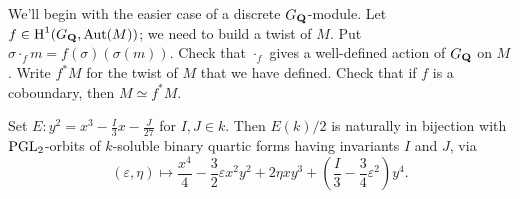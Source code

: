 We'll begin with the easier case of a discrete $G_{\mathbf{Q}}$-module. Let 
$f\in \operatorname{H}^1(G_{\mathbf{Q}},\operatorname{Aut}(M))$; we need to build a twist of $M$. 
Put $\sigma\cdot_f m = f(\sigma)(\sigma(m))$. Check that $\cdot_f$ gives 
a well-defined action of $G_{\mathbf{Q}}$ on $M$. Write $f^\ast M$ for the twist of $M$ 
that we have defined. Check that if $f$ is a coboundary, then 
$M\simeq f^\ast M$. 

\begin{theorem}
Set $E:y^2=x^3-\frac{I}{3} x-\frac{J}{27}$ for $I,J\in k$. Then 
$E(k)/2$ is naturally in bijection with $\operatorname{PGL}_2$-orbits of $k$-soluble 
binary quartic forms having invariants $I$ and $J$, via 
\[
  (\varepsilon,\eta)\mapsto \frac{x^4}{4}-\frac 3 2 \varepsilon x^2 y^2 + 2\eta x y^3 + \left(\frac I 3-\frac 3 4 \varepsilon^2\right) y^4 .
\]
\end{theorem}





